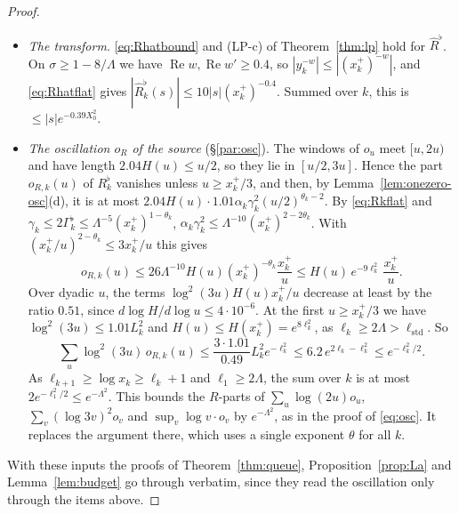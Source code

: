 \begin{proof}
\begin{itemize}
$0\le\psi_k\le1$). In Step~3 they are $F_{\theta_j}\le F_{1/2}\le1.33$ and the second-derivative bound of
Lemma~\ref{lem:onezero-osc}(d). The separation in Step~4 uses $\log\Gamma_j^\flat\ge(1-\theta_j)\log x_j-\Lambda-\log\log x_j-1$, and Step~5
uses $1-\theta_j\ge\frac12$. Cells $[v_j,2v_j)$ beyond $ey_k$ contribute $0$ to the Pointwise sum, so its bound $526\kappa_0$ is not
increased. The design facts before Proposition~\ref{prop:g1} hold with $\theta_k$ and $\Gamma_k^\flat$; the frequencies keep
$\log\gamma_k\ge\frac12\log x_k$.
\item \emph{The transform.} \eqref{eq:Rhatbound} and (LP-c) of Theorem~\ref{thm:lp} hold for $\widehat R^\flat$. On
$\sigma\ge1-8/\Lambda$ we have $\operatorname{Re}w,\operatorname{Re}w'\ge0.4$, so $|y_k^{-w}|\le|(x_k^+)^{-w}|$, and \eqref{eq:Rhatflat}
gives $|\widehat R_k^\flat(s)|\le10|s|(x_k^+)^{-0.4}$. Summed over $k$, this is $\le|s|e^{-0.39X_0^2}$.
\item \emph{The oscillation $o_R$ of the source} (\S\ref{par:osc}). The windows of $o_u$ meet $[u,2u)$ and have length
$2.04H(u)\le u/2$, so they lie in $[u/2,3u]$. Hence the part $o_{R,k}(u)$ of $R_k^\flat$ vanishes unless $u\ge x_k^+/3$, and then, by
Lemma~\ref{lem:onezero-osc}(d), it is at most $2.04H(u)\cdot1.01\alpha_k\gamma_k^2(u/2)^{\theta_k-2}$. By \eqref{eq:Rkflat} and
$\gamma_k\le2\Gamma_k^\flat\le\Lambda^{-5}(x_k^+)^{1-\theta_k}$, $\alpha_k\gamma_k^2\le\Lambda^{-10}(x_k^+)^{2-2\theta_k}$. With
$(x_k^+/u)^{2-\theta_k}\le3x_k^+/u$ this gives
\[
  o_{R,k}(u)\le26\Lambda^{-10}H(u)(x_k^+)^{-\theta_k}\frac{x_k^+}u\le H(u)\,e^{-9\ell_k^2}\,\frac{x_k^+}u .
\]
Over dyadic $u$, the terms $\log^2(3u)H(u)x_k^+/u$ decrease at least by the ratio $0.51$, since $d\log H/d\log u\le4\cdot10^{-6}$. At the
first $u\ge x_k^+/3$ we have $\log^2(3u)\le1.01L_k^2$ and $H(u)\le H(x_k^+)=e^{8\ell_k^2}$, as $\ell_k\ge2\Lambda>\ell_{\mathrm{std}}$. So
\[
  \sum_u\log^2(3u)\,o_{R,k}(u)\le\frac{3\cdot1.01}{0.49}L_k^2e^{-\ell_k^2}\le6.2\,e^{2\ell_k-\ell_k^2}\le e^{-\ell_k^2/2}.
\]
As $\ell_{k+1}\ge\log x_k\ge\ell_k+1$ and $\ell_1\ge2\Lambda$, the sum over $k$ is at most $2e^{-\ell_1^2/2}\le e^{-\Lambda^2}$. This bounds the
$R$-parts of $\sum_u\log(2u)o_u$, $\sum_v(\log3v)^2o_v$ and $\sup_v\log v\cdot o_v$ by $e^{-\Lambda^2}$, as in the proof of
\eqref{eq:osc}. It replaces the argument there, which uses a single exponent $\theta$ for all $k$.
\end{itemize}
With these inputs the proofs of Theorem~\ref{thm:queue}, Proposition~\ref{prop:La} and Lemma~\ref{lem:budget} go through verbatim,
since they read the oscillation only through the items above.
\end{proof}

